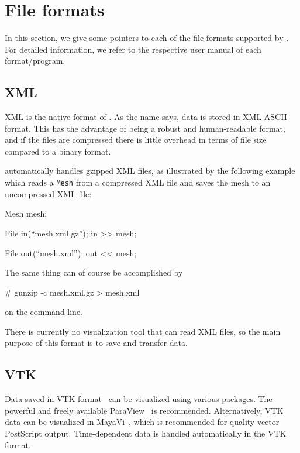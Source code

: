 \section{File formats}

In this section, we give some pointers to each of the file formats
supported by \dolfin{}. For detailed information, we refer to the
respective user manual of each format/program.


\subsection{\dolfin{} XML}

\dolfin{} XML is the native format of \dolfin{}. As the name says,
data is stored in XML ASCII format. This has the advantage of being a
robust and human-readable format, and if the files are compressed
there is little overhead in terms of file size compared to a binary
format.

\dolfin{} automatically handles gzipped XML files, as
illustrated by the following example which reads a \texttt{Mesh} from
a compressed \dolfin{} XML file and saves the mesh to an uncompressed
\dolfin{} XML file:
\begin{code}
  Mesh mesh;

  File in(``mesh.xml.gz'');
  in >> mesh;

  File out(``mesh.xml'');
  out << mesh;
\end{code}
The same thing can of course be accomplished by
\begin{code}
  # gunzip -c mesh.xml.gz > mesh.xml
\end{code}
on the command-line.

There is currently no visualization tool that can read \dolfin{} XML
files, so the main purpose of this format is to save and transfer data.

\subsection{VTK}

Data saved in VTK format~\cite{www:VTK} can be visualized using various
packages. The powerful and freely available ParaView~\cite{www:ParaView} 
is recommended. Alternatively, VTK data can be visualized in 
MayaVi~\cite{www:MayaVi}, which is recommended for quality vector PostScript 
output. Time-dependent data is handled automatically in the VTK format.

